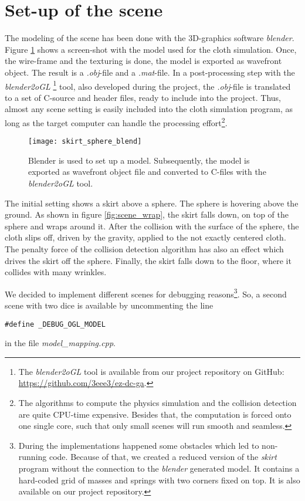 \section{Set-up of the scene}
The modeling of the scene has been done with the 3D-graphics software \textit{blender}. Figure \ref{fig:blender} shows a screen-shot with the model used for the cloth simulation. Once, the wire-frame and the texturing is done, the model is exported as wavefront object. The result is a \textit{.obj}-file and a \textit{.mat}-file. In a post-processing step with the \textit{blender2oGL} \footnote{The \textit{blender2oGL} tool is available from our project repository on GitHub: \url{https://github.com/3eee3/ez-dc-ga}.} tool, also developed during the project, the \textit{.obj}-file is translated to a set of C-source and header files, ready to include into the project. Thus, almost any scene setting is easily included into the cloth simulation program, as long as the target computer can handle the processing effort\footnote{The algorithms to compute the physics simulation and the collision detection are quite CPU-time expensive. Besides that, the computation is forced onto one single core, such that only small scenes will run smooth and seamless.}.
\begin{figure}[h]
	\centering
	\texttt{[image: skirt\_sphere\_blend]}
	\caption{Blender is used to set up a model. Subsequently, the model is exported as wavefront object file and converted to C-files with the \textit{blender2oGL} tool.}
	\label{fig:blender}
\end{figure}

The initial setting shows a skirt above a sphere. The sphere is hovering above the ground. As shown in figure \ref{fig:scene_wrap}, the skirt falls down, on top of the sphere and wraps around it. After the collision with the surface of the sphere, the cloth slips off, driven by the gravity, applied to the not exactly centered cloth. The penalty force of the collision detection algorithm has also an effect which drives the skirt off the sphere. Finally, the skirt falls down to the floor, where it collides with many wrinkles.\par
We decided to implement different scenes for debugging reasons\footnote{During the implementations happened some obstacles which led to non-running code. Because of that, we created a reduced version of the \textit{skirt} program without the connection to the \textit{blender} generated model. It contains a hard-coded grid of masses and springs with two corners fixed on top. It is also available on our project repository.}. So, a second scene with two dice is available by uncommenting the line
\begin{verbatim}
#define _DEBUG_OGL_MODEL
\end{verbatim}
in the file \textit{model\_mapping.cpp}.

